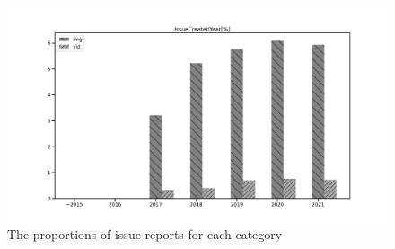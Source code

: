 \begin{figure}[h]
\centering
\includegraphics[width=0.6\linewidth]{./figures/data-category-trend.pdf}
\caption{ 
  The proportions of issue reports for each category
  }
\label{fig:data-cat-trend}
\end{figure}